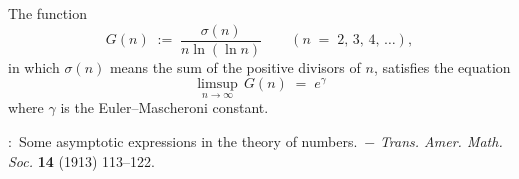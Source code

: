 \documentclass[12pt]{article}
\theoremstyle{definition}
\begin{document}

The function
$$G(n) \; :=\; \frac{\sigma(n)}{n\ln(\ln{n})} \qquad (n \;=\; 2,\,3,\,4,\,\ldots),$$
in which $\sigma(n)$ means the sum of the positive divisors of $n$, satisfies the equation
$$\limsup_{n\to\infty}\,G(n) \;=\; e^{\gamma}$$
where $\gamma$ is the Euler--Mascheroni constant.


\begin{thebibliography}{8}
:\, Some asymptotic expressions in the theory of numbers.\, $-$ 
\emph{Trans. Amer. Math. Soc.} \textbf{14} (1913) 113--122.
\end{thebibliography}

\end{document}
